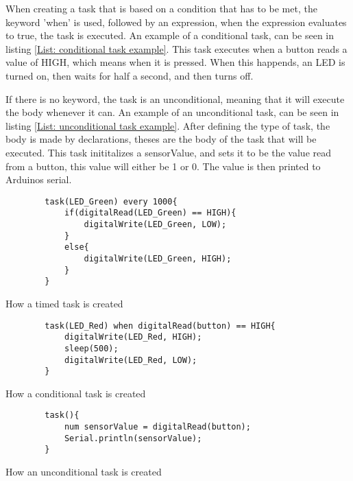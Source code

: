 When creating a task that is based on a condition that has to be met, the keyword 'when' is used, followed by an expression, when the expression evaluates to true, the task is executed. An example of a conditional task, can be seen in listing \ref*{List: conditional task example}. This task executes when a button reads a value of HIGH, which means when it is pressed. When this happends, an LED is turned on, then waits for half a second, and then turns off.

If there is no keyword, the task is an unconditional, meaning that it will execute the body whenever it can. An example of an unconditional task, can be seen in listing \ref*{List: unconditional task example}. After defining the type of task, the body is made by declarations, theses are the body of the task that will be executed. This task inititalizes a sensorValue, and sets it to be the value read from a button, this value will either be 1 or 0. The value is then printed to Arduinos serial.

\begin{listing}
    \begin{verbatim}
        task(LED_Green) every 1000{
            if(digitalRead(LED_Green) == HIGH){
                digitalWrite(LED_Green, LOW);
            }
            else{
                digitalWrite(LED_Green, HIGH);
            }
        }
    \end{verbatim}
    \caption{How a timed task is created}
    \label{List: Timed task example}
\end{listing}

\begin{listing}
    \begin{verbatim}
        task(LED_Red) when digitalRead(button) == HIGH{
            digitalWrite(LED_Red, HIGH);
            sleep(500);
            digitalWrite(LED_Red, LOW); 
        }
    \end{verbatim}
    \caption{How a conditional task is created}
    \label{List: conditional task example}
\end{listing}

\begin{listing}
    \begin{verbatim}
        task(){
            num sensorValue = digitalRead(button);
            Serial.println(sensorValue);
        }
    \end{verbatim}
    \caption{How an unconditional task is created}
    \label{List: unconditional task example}
\end{listing}


